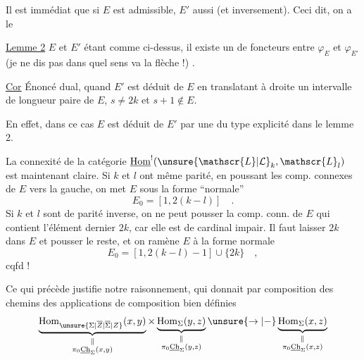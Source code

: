 Il est immédiat que si $E$ est admissible, $E'$ aussi (et
inversement). Ceci dit, on a le

\uline{Lemme 2} \quad $E$ et $E'$ étant comme ci-dessus, il existe un
  de foncteurs entre $\varphi_E$ et $\varphi_{E'}$ (je ne dis
pas dans quel sens va la flèche !) \deleted{\unsure{$\leftarrow$}}.

\uline{Cor} \quad Énoncé dual, quand $E'$ est déduit de $E$ en translatant
à droite  un intervalle  de longueur paire  de $E$, 
$s\ne 2k$ et $s+1\notin E$.

En effet, dans ce cas $E$ est déduit de $E'$ par une  du
type explicité dans le lemme 2.

La connexité de la catégorie $\underline{\mathrm{Hom}}^{!}(\unsure{\mathscr{L}|\mathcal{L}}_k,\mathscr{L}_l)$ est
maintenant claire. Si $k$ et $l$ ont même parité,
en poussant les comp. connexes de $E$ vers la gauche,
on met $E$ sous la forme ``normale''
\[
E_0=[1,2(k-l)]\quad .
\]
Si $k$ et $l$ sont de parité inverse, on  ne peut
pousser  la comp. conn. de $E$ qui contient
l'élément dernier $2k$, car elle est de cardinal impair.
Il faut laisser $2k$ dans $E$ et pousser le reste, et
on ramène $E$ à la forme normale
\[
E_0=[1,2(k-l)-1]\cup\{2k\}\quad ,
\]
cqfd !

 Ce qui précède justifie notre raisonnement,
qui donnait par composition des chemins des
applications de composition bien définies
\[
\underbrace{\operatorname{Hom}_{\unsure{\Sigma|\overline{Z}|\overline{\Sigma}|Z}}(x,y)}_{\substack{\Vert\\\pi_0\underline{\mathrm{Ch}}_\Sigma(x,y)}}
\times\underbrace{\operatorname{Hom}_{\Sigma}(y,z)}_{\substack{\Vert\\\pi_0\underline{\mathrm{Ch}}_\Sigma(y,z)}}
\unsure{\to|\mathord{-}}
\underbrace{\operatorname{Hom}_{\Sigma}(x,z)}_{\substack{\Vert\\\pi_0\underline{\mathrm{Ch}}_\Sigma(x,z)}}
\]
